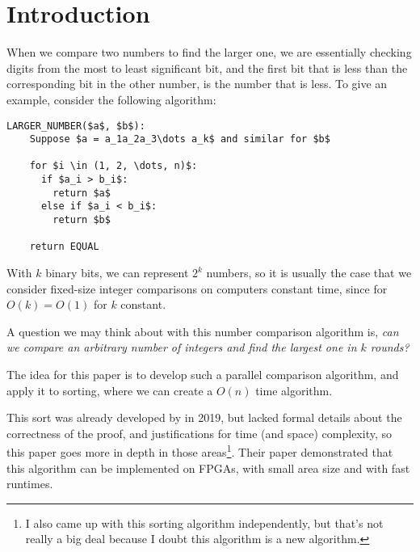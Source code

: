 \documentclass{article}
\begin{document}
\maketitle

\begin{abstract}
  We introduce a non-comparison based sort that runs in linear time, with fixed number bit size, and logic gates of linear size.
  We show that this sort can be implemented with very simple hardware components, which makes it a good candidate for a sorting algorithm on ASICs or FPGAs.
\end{abstract}


\section{Introduction}
When we compare two numbers to find the larger one, we are essentially checking digits from the most to least significant bit, and the first bit that is less than the corresponding bit in the other number, is the number that is less.
To give an example, consider the following algorithm:

\begin{lstlisting}[label={alg:find_larger_number}, caption={Algorithm to find the larger of two numbers.}]
	LARGER_NUMBER($a$, $b$):
    Suppose $a = a_1a_2a_3\dots a_k$ and similar for $b$

    for $i \in (1, 2, \dots, n)$:
      if $a_i > b_i$:
        return $a$
      else if $a_i < b_i$:
        return $b$

    return EQUAL
\end{lstlisting}

With $k$ binary bits, we can represent $2^k$ numbers, so it is usually the case that we consider fixed-size integer comparisons on computers constant time, since for $O(k) = O(1)$ for $k$ constant.

A question we may think about with this number comparison algorithm is, \textit{can we compare an arbitrary number of integers and find the largest one in $k$ rounds?}

The idea for this paper is to develop such a parallel comparison algorithm, and apply it to sorting, where we can create a $O(n)$ time algorithm.

This sort was already developed by \cite{ghosh} in 2019, but lacked formal details about the correctness of the proof, and justifications for time (and space) complexity, so this paper goes more in depth in those areas\footnote{I also came up with this sorting algorithm independently, but that's not really a big deal because I doubt this algorithm is a new algorithm.}.
Their paper demonstrated that this algorithm can be implemented on FPGAs, with small area size and with fast runtimes.
\end{document}
